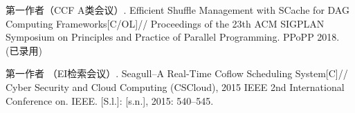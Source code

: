 
\begin{publications}{99}
    \item\textsc{第一作者（CCF A类会议）}. {Efficient Shuffle Management with SCache for DAG Computing Frameworks}[C/OL]// Proceedings of the 23th ACM SIGPLAN Symposium on Principles and Practice of
    Parallel Programming. PPoPP 2018. (已录用)
    \item\textsc{第一作者 （EI检索会议）}. {Seagull–A Real-Time Coflow Scheduling System}[C]// Cyber Security
    and Cloud Computing (CSCloud), 2015 IEEE 2nd International Conference on. IEEE. [S.l.]: [s.n.],
    2015: 540–545.
\end{publications}
